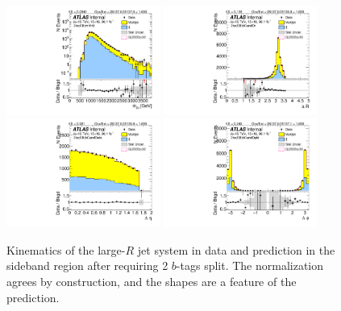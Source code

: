 \begin{figure}[htbp!]
\begin{center}
\includegraphics[width=0.45\textwidth,angle=-90]{figures/boosted/Sideband/b77_TwoTag_split_Sideband_mHH_l_1.pdf}
\includegraphics[width=0.45\textwidth,angle=-90]{figures/boosted/Sideband/b77_TwoTag_split_Sideband_hCandDr.pdf}\\
\includegraphics[width=0.45\textwidth,angle=-90]{figures/boosted/Sideband/b77_TwoTag_split_Sideband_hCandDeta.pdf}
\includegraphics[width=0.45\textwidth,angle=-90]{figures/boosted/Sideband/b77_TwoTag_split_Sideband_hCandDphi.pdf}
  \caption{Kinematics of the large-$R$ jet system in data and prediction in the sideband region after requiring 2 $b$-tags split. The normalization agrees by construction, and the shapes are a feature of the prediction. }
  \label{fig:boosted-2bs-sideband-ak10-system}
\end{center}
\end{figure}

